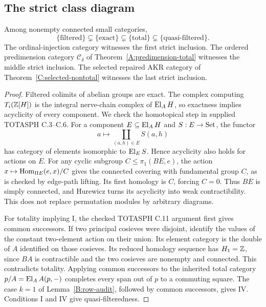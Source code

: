 \subsection{The strict class diagram}
\begin{proposition}\label{D:known-diagram}
Among nonempty connected small categories,
\[
 \{\text{filtered}\}\subsetneq\{\text{exact}\}
 \subsetneq\{\text{total}\}\subsetneq\{\text{quasi-filtered}\}.
\]
The ordinal-injection category witnesses the first strict inclusion.
The ordered predimension category $\mathcal C_\delta$ of
Theorem~\ref{A:predimension-total} witnesses the middle strict inclusion.
The selected repaired AKR category of
Theorem~\ref{C:selected-nontotal} witnesses the last strict inclusion.
\end{proposition}
\begin{proof}
Filtered colimits of abelian groups are exact. The complex computing
$T_i(\mathbb Z[H])$ is the integral nerve-chain complex of $\operatorname{El}_AH$, so
exactness implies acyclicity of every component. We check the
homotopical step in supplied TOTASPH C.3--C.6. For a component
$E\subseteq\operatorname{El}_AH$ and $S:E\to\mathrm{Set}$, the functor
\[
 a\longmapsto\coprod_{(a,h)\in E}S(a,h)
\]
has category of elements isomorphic to $\operatorname{El}_E S$. Hence acyclicity
also holds for actions on $E$. For any cyclic subgroup
$C\leq\pi_1(BE,e)$, the action
$x\mapsto\operatorname{Hom}_{\Pi E}(e,x)/C$ gives the connected covering with
fundamental group $C$, as is checked by edge-path lifting. Its first
homology is $C$, forcing $C=0$. Thus $BE$ is simply connected,
and Hurewicz turns its acyclicity into weak contractibility. This
does not replace permutation modules by arbitrary diagrams.

For totality implying I, the checked TOTASPH C.11 argument first
gives common successors. If two principal cosieves were disjoint,
identify the values of the constant two-element action on their
union. Its element category is the double of $A$ identified on
those cosieves. Its reduced homology sequence has $H_1=\mathbb Z$,
since $BA$ is contractible and the two cosieves are nonempty and
connected. This contradicts totality. Applying common successors
to the inherited total category $p/A=\operatorname{El}_A A(p,-)$ completes
every span out of $p$ to a commuting square. The case $k=1$ of
Lemma~\ref{B:row-audit}, followed by common successors, gives
IV. Conditions I and IV give quasi-filteredness.


\end{proof}
